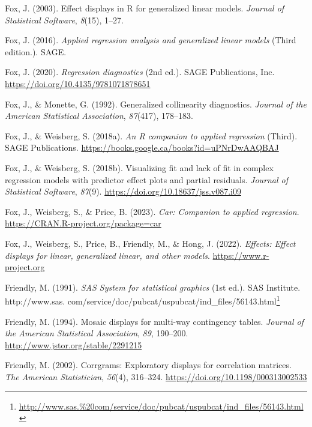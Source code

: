 \documentclass[
  letterpaper,
  10pt,
  krantz2]{krantz}
\newlength{\cslhangindent}
\newenvironment{CSLReferences}[2] %
 {\begin{list}{}{%
  \setlength{\itemindent}{0pt}
  \setlength{\leftmargin}{0pt}
  \setlength{\parsep}{0pt}
  \ifodd #1
   \setlength{\leftmargin}{\cslhangindent}
   \setlength{\itemindent}{-1\cslhangindent}
  \fi
  \setlength{\itemsep}{#2\baselineskip}}}
 {\end{list}}
\providecommand{\href}[2]{#2\footnote{\url{#1}}}
\begin{document}
{\begin{CSLReferences}{1}{0}
Fox, J. (2003). Effect displays in {R} for generalized linear models.
\emph{Journal of Statistical Software}, \emph{8}(15), 1--27.

Fox, J. (2016). \emph{Applied regression analysis and generalized linear
models} (Third edition.). SAGE.

Fox, J. (2020). \emph{Regression diagnostics} (2nd ed.). {SAGE}
Publications, Inc. \url{https://doi.org/10.4135/9781071878651}

Fox, J., \& Monette, G. (1992). Generalized collinearity diagnostics.
\emph{Journal of the American Statistical Association}, \emph{87}(417),
178--183.

Fox, J., \& Weisberg, S. (2018a). \emph{An {R} companion to applied
regression} (Third). SAGE Publications.
\url{https://books.google.ca/books?id=uPNrDwAAQBAJ}

Fox, J., \& Weisberg, S. (2018b). Visualizing fit and lack of fit in
complex regression models with predictor effect plots and partial
residuals. \emph{Journal of Statistical Software}, \emph{87}(9).
\url{https://doi.org/10.18637/jss.v087.i09}

Fox, J., Weisberg, S., \& Price, B. (2023). \emph{Car: Companion to
applied regression}. \url{https://CRAN.R-project.org/package=car}

Fox, J., Weisberg, S., Price, B., Friendly, M., \& Hong, J. (2022).
\emph{Effects: Effect displays for linear, generalized linear, and other
models}. \url{https://www.r-project.org}

Friendly, M. (1991). \emph{{SAS System} for statistical graphics} (1st
ed.). SAS Institute.
\href{http://www.sas.\%20com/service/doc/pubcat/uspubcat/ind_files/56143.html}{http://www.sas.
com/service/doc/pubcat/uspubcat/ind\_files/56143.html}

Friendly, M. (1994). Mosaic displays for multi-way contingency tables.
\emph{Journal of the American Statistical Association}, \emph{89},
190--200. \url{http://www.jstor.org/stable/2291215}

Friendly, M. (2002). Corrgrams: Exploratory displays for correlation
matrices. \emph{The American Statistician}, \emph{56}(4), 316--324.
\url{https://doi.org/10.1198/000313002533}


\end{CSLReferences}}
\end{document}
